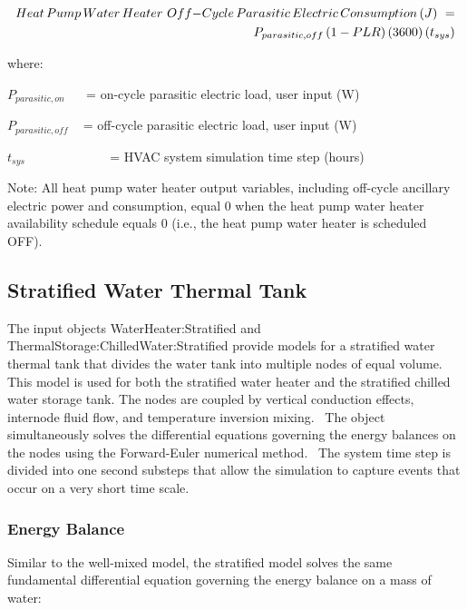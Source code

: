 \begin{equation}
\begin{split}
Heat\,Pump\,Water\,Heater\,\,Off{\rm{ - }}Cycle\,Parasitic\,Electric\,Consumption\,(J)\,\, = \\{P_{parasitic,off}}\left( {1 - PLR} \right)\left( {3600} \right)\left( {{t_{sys}}} \right)
\end{split}
\end{equation}

where:

\({P_{parasitic,on}}\) ~~ = on-cycle parasitic electric load, user input (W)

\({P_{parasitic,off}}\) ~ = off-cycle parasitic electric load, user input (W)

\({t_{sys}}\) ~~~~~~~~~~~~ = HVAC system simulation time step (hours)

Note: All heat pump water heater output variables, including off-cycle ancillary electric power and consumption, equal 0 when the heat pump water heater availability schedule equals 0 (i.e., the heat pump water heater is scheduled OFF).

\subsection{Stratified Water Thermal Tank}\label{stratified-water-thermal-tank}

The input objects WaterHeater:Stratified and ThermalStorage:ChilledWater:Stratified provide models for a stratified water thermal tank that divides the water tank into multiple nodes of equal volume.~ This model is used for both the stratified water heater and the stratified chilled water storage tank. The nodes are coupled by vertical conduction effects, internode fluid flow, and temperature inversion mixing.~ The object simultaneously solves the differential equations governing the energy balances on the nodes using the Forward-Euler numerical method.~ The system time step is divided into one second substeps that allow the simulation to capture events that occur on a very short time scale.

\subsubsection{Energy Balance}\label{energy-balance-1}

Similar to the well-mixed model, the stratified model solves the same fundamental differential equation governing the energy balance on a mass of water:

